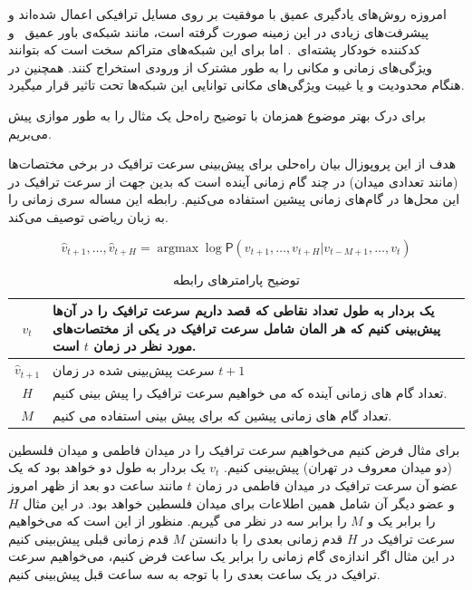 \documentclass{article}
\begin{document}
امروزه روش‌های یادگیری عمیق با موفقیت بر روی مسايل ترافیکی اعمال شده‌اند و پیشرفت‌های زیادی در این زمینه صورت گرفته است،
مانند شبکه‌ی باور عمیق~ و کدکننده خودکار پشته‌ای~.
اما برای این شبکه‌های متراکم سخت است که بتوانند ویژگی‌های زمانی و مکانی را به طور مشترک از ورودی استخراج کنند.
همچنین در هنگام محدودیت و یا غیبت ویژگی‌های مکانی توانایی این شبکه‌ها تحت تاثیر قرار میگیرد.


برای درک بهتر موضوع همزمان با توضیح راه‌حل یک مثال را به طور موازی پیش می‌بریم.

هدف از این پروپوزال بیان راه‌حلی برای پیش‌بینی سرعت ترافیک در برخی مختصات‌ها (مانند تعدادی میدان) در چند گام زمانی آینده است که
بدین جهت از سرعت ترافیک در این محل‌ها در گام‌های زمانی پیشین استفاده می‌کنیم. رابطه  این مساله سری زمانی را به زبان ریاضی توصیف می‌کند.

\begin{equation}
  \label{eq:base}
  \hat{v}_{t+1}, \ldots,  \hat{v}_{t+H} = \mathop{\mathrm{argmax}} \log \mathsf{P}({v}_{t+1}, \ldots,  v_{t+H} | v_{t-M+1} , \ldots,  v_{t})
\end{equation}

\begin{table}[h]
  \centering
  \caption{توضیح پارامترهای رابطه }
  \begin{tabular}{|c|p{}|}
    \hline
    $v_{t}$ & یک بردار به طول تعداد نقاطی که قصد داریم سرعت ترافیک را در آن‌ها پیش‌بینی کنیم که هر المان شامل سرعت ترافیک در یکی از مختصات‌های مورد نظر در زمان $t$ است. \\
    \hline
    $\hat{v}_{t+1}$ & سرعت پیش‌بینی شده در زمان $t+1$ \\
    \hline
    $H$ & تعداد گام های زمانی آینده که می خواهیم سرعت ترافیک را پیش بینی کنیم. \\
    \hline
    $M$ & تعداد گام های زمانی پیشین که برای پیش بینی استفاده می کنیم. \\
    \hline
  \end{tabular}
  \label{tbl:base}
\end{table}

برای مثال فرض کنیم می‌خواهیم سرعت ترافیک را در میدان فاطمی و میدان فلسطین (دو میدان معروف در تهران) پیش‌بینی کنیم.
$v_{t}$ یک بردار به طول دو خواهد بود که یک عضو آن سرعت ترافیک در میدان فاطمی در زمان $t$ مانند ساعت دو بعد از ظهر امروز و عضو دیگر آن شامل همین اطلاعات برای میدان فلسطین خواهد بود.
در این مثال $H$ را برابر یک و $M$ را برابر سه در نظر می گیریم. منظور از  این است که می‌خواهیم سرعت ترافیک در $H$ قدم زمانی بعدی را با دانستن $M$ قدم زمانی قبلی پیش‌بینی کنیم
در این مثال اگر اندازه‌ی گام زمانی را برابر یک ساعت فرض کنیم، می‌خواهیم سرعت ترافیک در یک ساعت بعدی را با توجه به سه ساعت قبل پیش‌بینی کنیم.
\end{document}
